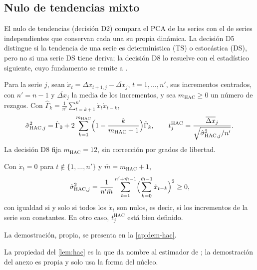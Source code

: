 \subsection{Nulo de tendencias mixto}
\label{sec:nulo-mixto}

El nulo de tendencias (decisión D2) compara el PCA de las series con el de series independientes
que conservan cada una su propia dinámica. La decisión D5 distingue si la tendencia de una serie es
determinística (TS) o estocástica (DS), pero no si una serie DS tiene deriva; la decisión D8 lo
resuelve con el estadístico siguiente, cuyo fundamento se remite a
\textcite{newey_west_1987}.

\begin{definicion}\label{def:hac}
Para la serie $j$, sean $\dot x_t=\Delta x_{t+1,j}-\overline{\Delta x}_j$, $t=1,\dots,n'$, sus
incrementos centrados, con $n'=n-1$ y $\overline{\Delta x}_j$ la media de los incrementos, y sea
$m_{\mathrm{HAC}}\ge0$ un número de rezagos. Con $\hat\Gamma_k=\frac1{n'}\sum_{t=k+1}^{n'}\dot x_t
\dot x_{t-k}$,
\[
  \hat\sigma^2_{\mathrm{HAC},j}=\hat\Gamma_0+2\sum_{k=1}^{m_{\mathrm{HAC}}}
  \Bigl(1-\frac{k}{m_{\mathrm{HAC}}+1}\Bigr)\hat\Gamma_k ,
  \qquad
  t^{\mathrm{HAC}}_j=\frac{\overline{\Delta x}_j}{\sqrt{\hat\sigma^2_{\mathrm{HAC},j}/n'}} .
\]
La decisión D8 fija $m_{\mathrm{HAC}}=12$, sin corrección por grados de libertad.
\end{definicion}

\begin{lema}\label{lem:hac}
Con $\dot x_t=0$ para $t\notin\{1,\dots,n'\}$ y $\bar m=m_{\mathrm{HAC}}+1$,
\[
  \hat\sigma^2_{\mathrm{HAC},j}=\frac{1}{n'\bar m}\sum_{t=1}^{n'+\bar m-1}
  \Bigl(\sum_{k=0}^{\bar m-1}\dot x_{t-k}\Bigr)^2\ge0,
\]
con igualdad si y solo si todos los $\dot x_t$ son nulos, es decir, si los incrementos de la serie
son constantes. En otro caso, $t^{\mathrm{HAC}}_j$ está bien definido.
\end{lema}

La demostración, propia, se presenta en la \cref{ap:dem-hac}.

La propiedad del \cref{lem:hac} es la que da nombre al estimador de \textcite{newey_west_1987}; la
demostración del anexo es propia y solo usa la forma del núcleo.

